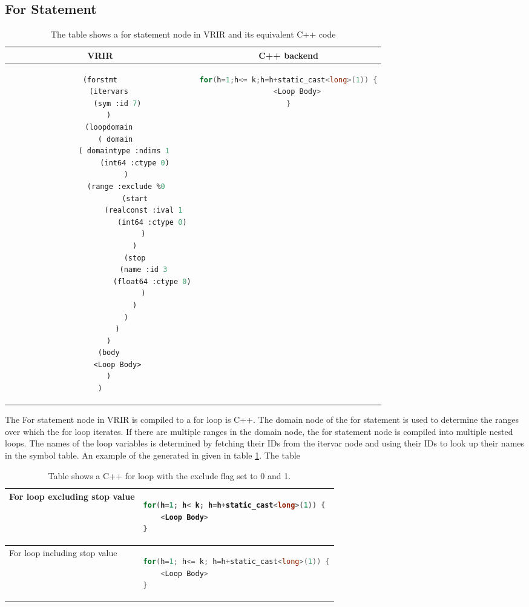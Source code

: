 \subsection{For Statement}
\begin{table}[htbp]
\begin{tabular}{|c|c|}
\hline 
VRIR & C++ backend \\
\hline 
{
\begin{lstlisting}[language=lisp, frame=none, numbers=none]
(forstmt
	(itervars
		(sym :id 7)
	)
	(loopdomain
		( domain 
			( domaintype :ndims 1 
				(int64 :ctype 0)
			)
			(range :exclude %0
				(start
					(realconst :ival 1
						(int64 :ctype 0)
					)
				)
				(stop
					(name :id 3
						(float64 :ctype 0)
					)
				)
			)
		)
	)
	(body
		<Loop Body>
	)
)

\end{lstlisting}
} & 
{
\begin{lstlisting}[language=c,frame=none, numbers=none]
for(h=1;h<= k;h=h+static_cast<long>(1)) {
	<Loop Body>
}
\end{lstlisting}
} \\
\hline
\end{tabular}
\caption[For Statement]{The table shows a for statement node in VRIR and its equivalent C++ code}
\label{tab:forStmt}
\end{table}
The For statement node in VRIR is compiled to a for loop is C++. The domain node of the for statement is used to determine the ranges over which the for loop iterates. If there are multiple ranges in the domain node, the for statement node is compiled into multiple nested loops. The names of the loop variables is determined by fetching their IDs from the itervar node and using their IDs to look up their names in the symbol table. An example of the generated in given in table \ref{tab:forStmt}. The table 
\begin{table}[htbp]
\begin{tabular}{|l|l|}
\hline

For loop excluding stop value & 
{
\begin{lstlisting}[language=c,frame=none, numbers=none]
for(h=1; h< k; h=h+static_cast<long>(1)) {
	<Loop Body>
}
\end{lstlisting}
}
 \\
\hline 

For loop including stop value & 
{
\begin{lstlisting}[language=c,frame=none, numbers=none]
for(h=1; h<= k; h=h+static_cast<long>(1)) {
	<Loop Body>
}
\end{lstlisting}
} \\
\hline
\end{tabular}
\caption[Use of exclude flag in For statement]{Table shows a C++ for loop with the exclude flag set to 0 and 1.}
\label{tab:excludeFor}
\end{table}
